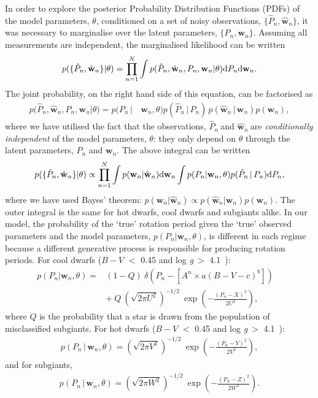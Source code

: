 \documentclass[11pt,preprint]{aastex}
\newcommand{\logg}{log \emph{g}}
\newcommand{\w}{\mathbf{w}}
\newcommand{\wh}{$\hat{\mathbf{w}}_n$}
\newcommand{\ph}{$\hat{P}_n$}
\newcommand{\subcut}{4.1~}
\begin{document}
In order to explore the posterior Probability Distribution Functions (PDFs) of
the model parameters, $\theta$, conditioned on a set of noisy observations,
$\{\hat{P}_n, \hat{\mathbf{w}}_n\}$, it was necessary to marginalise over the
latent parameters, $\{P_n, \mathbf{w}_n\}$.
Assuming all measurements are independent, the marginalised likelihood can be
written
\begin{equation}
	p(\{\hat{P}_n,\hat{\w}_n\}|\theta) =
	\prod_{n=1}^{N} \int p(\hat{P}_n,\hat{\w}_n,P_n,\w_n|\theta)
	{\rm d}P_n {\rm d}\w_n.
\label{eq:fulll}
\end{equation}
The joint probability, on the right hand side of this equation, can be
factorised as
\begin{align}
	p(\hat{P}_n,\hat{\w}_n,P_n,\w_n|\theta) = p(P_n\,| & \,\w_n,\theta)
	p(\hat{P}_n\,|\,P_n)\,p(\hat{\w}_n\,|\,\w_n)p(\w_n),
\nonumber
\end{align}
where we have utilised the fact that the observations, \ph$~$and \wh$~$are
{\it conditionally independent} of the model parameters, $\theta$: they only
depend on $\theta$ through the latent parameters, $P_n$ and $\w_n$.
The above integral can  be written
\begin{equation}
	p(\{\hat{P}_n,\hat{\w}_n\}|\theta) \propto
	\prod_{n=1}^{N} \int p(\w_n|\hat{\w}_n)
	{\rm d}\w_n \int p(P_n|\w_n,\theta) p(\hat{P}_n\,|\,P_n) {\rm d}P_n,
\label{eq:fac}
\end{equation}
where we have used Bayes' theorem:
$p(\w_n|\hat{\w}_n) \propto p(\hat{\w}_n|\w_n)p(\w_n)$.
The outer integral is the same for hot dwarfs, cool dwarfs and subgiants
alike.
In our model, the probability of the `true' rotation period given the `true'
observed parameters and the model parameters, $p(P_n|\w_n, \theta)$, is
different in each regime because a different generative process is responsible
for producing rotation periods.
For cool dwarfs ($B-V$ $<$ 0.45 and \logg$~>$ \subcut):
\begin{eqnarray}
	p(P_n|\w_n,\theta) =
	& (1-Q)~\delta \left (P_n - \left[A^n \times a(B-V - c)^b\right]
	\right) \quad \\ & +~Q~\left(\sqrt{2\pi U^2}\right)^{-1/2}
	~\exp\left({-\frac{(P_n-X)^2}{2U^2}}\right),
\end{eqnarray}
where $Q$ is the probability that a star is drawn from the population of
misclassified subgiants.
For hot dwarfs ($B-V$ $<$ 0.45 and \logg$~>$ \subcut):
\begin{eqnarray}
p(P_n\,|\,\w_n,\theta) = \left(\sqrt{2\pi V^2}\right)^{-1/2}~
\exp\left({-\frac{(P_n-Y)^2}{2V^2}}\right),
\end{eqnarray}
and for subgiants,
\begin{eqnarray}
p(P_n\,|\,\w_n,\theta) = \left(\sqrt{2\pi W^2}\right)^{-1/2}~
\exp\left({-\frac{(P_n-Z)^2}{2W^2}}\right).
\end{eqnarray}
\end{document}
